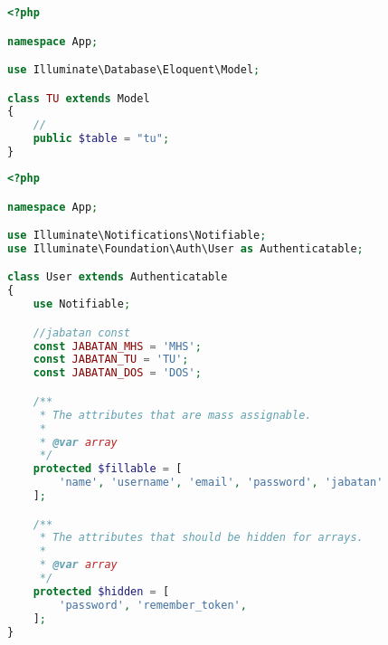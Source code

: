 \begin{lstlisting}[language=php, caption=TU.php]
	<?php

namespace App;

use Illuminate\Database\Eloquent\Model;

class TU extends Model
{
    //
    public $table = "tu";
}

\end{lstlisting}

\begin{lstlisting}[language=php, caption=User.php]
	<?php

namespace App;

use Illuminate\Notifications\Notifiable;
use Illuminate\Foundation\Auth\User as Authenticatable;

class User extends Authenticatable
{
    use Notifiable;

    //jabatan const
    const JABATAN_MHS = 'MHS';
    const JABATAN_TU = 'TU';
    const JABATAN_DOS = 'DOS';

    /**
     * The attributes that are mass assignable.
     *
     * @var array
     */
    protected $fillable = [
        'name', 'username', 'email', 'password', 'jabatan'
    ];

    /**
     * The attributes that should be hidden for arrays.
     *
     * @var array
     */
    protected $hidden = [
        'password', 'remember_token',
    ];
}

\end{lstlisting}